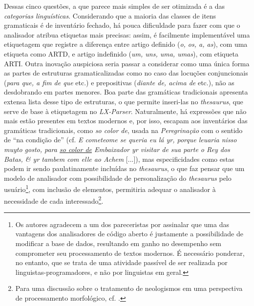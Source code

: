\documentclass[portuguese]{textolivre}
\begin{document}
Dessas cinco questões, a que parece mais simples de ser otimizada é a das \textit{categorias linguísticas}. Considerando que a maioria das classes de itens gramaticais é de inventário fechado, há pouca dificuldade para fazer com que o analisador atribua etiquetas mais precisas: assim, é facilmente implementável uma etiquetagem que registre a diferença entre artigo definido (\textit{o, os, a, as}), com uma etiqueta como ARTD, e artigo indefinido (\textit{um, uns, uma, umas}), com etiqueta ARTI. Outra inovação auspiciosa seria passar a considerar como uma única forma as partes de estruturas gramaticalizadas como no caso das locuções conjuncionais (\textit{para que, a fim de que} etc.) e prepositivas (\textit{diante de, acima de} etc.), não as desdobrando em partes menores. Boa parte das gramáticas tradicionais apresenta extensa lista desse tipo de estruturas, o que permite inseri-las no \textit{thesaurus}, que serve de base à etiquetagem no \textit{LX-Parser}. Naturalmente, há expressões que não mais estão presentes em textos modernos e, por isso, escapam aos inventários das gramáticas tradicionais, como \textit{so color de}, usada na \textit{Peregrinação} com o sentido de “na condição de” (cf. \textit{E cometeome se queria eu lá yr, porque leuaria nisso muyto gosto, para \underline{so color de} Embaixador yr visitar de sua parte o Rey dos Batas, \& yr tambem com elle ao Achem} [...]), mas especificidades como estas podem ir sendo paulatinamente incluídas no \textit{thesaurus}, o que faz pensar que um modelo de analisador com possibilidade de personalização do \textit{thesaurus} pelo usuário\footnote{Os autores agradecem a um dos pareceristas por assinalar que uma das vantagens dos analisadores de código aberto é justamente a possibilidade de modificar a base de dados, resultando em ganho no desempenho sem comprometer seu processamento de textos modernos. É necessário ponderar, no entanto, que se trata de uma atividade passível de ser realizada por linguistas-programadores, e não por linguistas em geral.}, com inclusão de elementos, permitiria adequar o analisador à necessidade de cada interessado\footnote{Para uma discussão sobre o tratamento de neologismos em uma perspectiva de processamento morfológico, cf. \textcite{alencar_produtividade_2009}.}.
\end{document}
